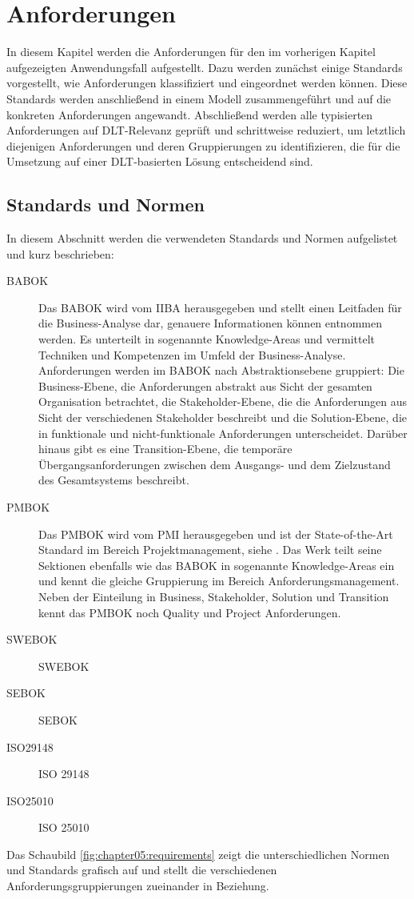 \chapter{Anforderungen}
\label{ch:requirements}
In diesem Kapitel werden die Anforderungen für den im vorherigen Kapitel aufgezeigten Anwendungsfall aufgestellt. Dazu werden zunächst einige Standards vorgestellt, wie Anforderungen klassifiziert und eingeordnet werden können. Diese Standards werden anschließend in einem Modell zusammengeführt und auf die konkreten Anforderungen angewandt. Abschließend werden alle typisierten Anforderungen auf \ac{DLT}-Relevanz geprüft und schrittweise reduziert, um letztlich diejenigen Anforderungen und deren Gruppierungen zu identifizieren, die für die Umsetzung auf einer \ac{DLT}-basierten Lösung entscheidend sind.

%
%
\section{Standards und Normen}
\label{sec:requirements:standards}
In diesem Abschnitt werden die verwendeten Standards und Normen aufgelistet und kurz beschrieben:
\begin{description}
  \item[BABOK] Das \ac{BABOK} wird vom \ac{IIBA} herausgegeben und stellt einen Leitfaden für die Business-Analyse dar, genauere Informationen können \cite{BABOK} entnommen werden. Es unterteilt in sogenannte Knowledge-Areas und vermittelt Techniken und Kompetenzen im Umfeld der Business-Analyse. Anforderungen werden im \ac{BABOK} nach Abstraktionsebene gruppiert: Die Business-Ebene, die Anforderungen abstrakt aus Sicht der gesamten Organisation betrachtet, die Stakeholder-Ebene, die die Anforderungen aus Sicht der verschiedenen Stakeholder beschreibt und die Solution-Ebene, die in funktionale und nicht-funktionale Anforderungen unterscheidet. Darüber hinaus gibt es eine Transition-Ebene, die temporäre Übergangsanforderungen zwischen dem Ausgangs- und dem Zielzustand des Gesamtsystems beschreibt.
  \item[PMBOK]  Das \ac{PMBOK} wird vom \ac{PMI} herausgegeben und ist der State-of-the-Art Standard im Bereich Projektmanagement, siehe \cite{PMBOK}. Das Werk teilt seine Sektionen ebenfalls wie das \ac{BABOK} in sogenannte Knowledge-Areas ein und kennt die gleiche Gruppierung im Bereich Anforderungsmanagement. Neben der Einteilung in Business, Stakeholder, Solution und Transition kennt das \ac{PMBOK} noch Quality und Project Anforderungen.
  \item[SWEBOK] \cite{SWEBOK} \ac{SWEBOK}
  \item[SEBOK] \cite{SEBOK} \ac{SEBOK}
  \item[ISO29148] \cite{ISO29148} \ac{ISO} 29148
  \item[ISO25010] \cite{ISO25010} \ac{ISO} 25010
\end{description}
Das Schaubild \ref{fig:chapter05:requirements} zeigt die unterschiedlichen Normen und Standards grafisch auf und stellt die verschiedenen Anforderungsgruppierungen zueinander in Beziehung.

